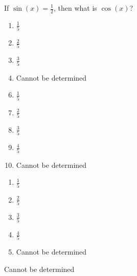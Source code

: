 



  If $\sin(x)=\frac{1}{2}$, then what is $\cos(x)$?


\ifsat
	\begin{enumerate}[label=\Alph*)]
		\item    $\frac{1}{5}$
		\item  $\frac{2}{5}$ 
		\item $\frac{3}{5}$
		\item  Cannot be determined %
	\end{enumerate}
\else
\fi

\ifacteven
	\begin{enumerate}[label=\textbf{\Alph*.},itemsep=\fill,align=left]
		\setcounter{enumii}{5}
		\item    $\frac{1}{5}$
		\item  $\frac{2}{5}$ 
		\item $\frac{3}{5}$
		\addtocounter{enumii}{1}
		\item $\frac{4}{5}$
		\item  Cannot be determined %
	\end{enumerate}
\else
\fi

\ifactodd
	\begin{enumerate}[label=\textbf{\Alph*.},itemsep=\fill,align=left]
		\item    $\frac{1}{5}$
		\item  $\frac{2}{5}$ 
		\item $\frac{3}{5}$
		\item $\frac{4}{5}$
		\item  Cannot be determined %
	\end{enumerate}
\else
\fi

\ifgridin
  Cannot be determined %

\else
\fi

